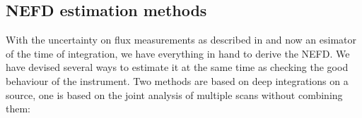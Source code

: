 

\subsection{NEFD estimation methods}

With the uncertainty on flux measurements as described in  and
now an esimator of the time of integration, we have everything in hand to derive
the NEFD. We have devised several ways to estimate it at the same time as
checking the good behaviour of the instrument. Two methods are based on deep
integrations on a source, one is based on the joint analysis of multiple scans
without combining them:

